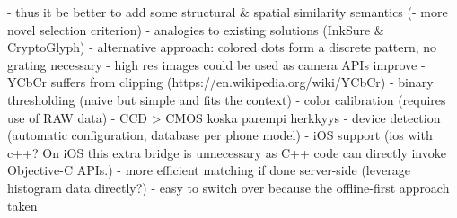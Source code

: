 \documentclass[thesis.tex]{subfiles}
\begin{document}
\begin{comment}
Color calibration

There are mainly two modules responsible for the color-rendering accuracy of a digital camera: the former is the illuminant estimation and correction module, and the latter is the color matrix transformation aimed to adapt the color response of the sensor to a standard color space. These two modules together form what may be called the color correction pipeline.

RGB is a device-dependent color model: different devices detect or reproduce a given RGB value differently, since the color elements (such as phosphors or dyes) and their response to the individual R, G, and B levels vary from manufacturer to manufacturer, or even in the same device over time. Thus an RGB value does not define the same color across devices without some kind of color management.

\url{http://www.cis.rit.edu/~jxj1770/publications/paperEI_Xerox.pdf}

\url{http://www.cs.unc.edu/techreports/04-012.pdf}
\end{comment}

- thus it be better to add some structural \& spatial similarity semantics (- more novel selection criterion) - analogies to existing solutions (InkSure \& CryptoGlyph)
  - alternative approach: colored dots form a discrete pattern, no grating necessary
- high res images could be used as camera APIs improve
- YCbCr suffers from clipping (https://en.wikipedia.org/wiki/YCbCr)
- binary thresholding (naive but simple and fits the context)
- color calibration (requires use of RAW data)
  - CCD > CMOS koska parempi herkkyys
- device detection (automatic configuration, database per phone model)
- iOS support (ios with c++? On iOS this extra bridge is unnecessary as C++ code can directly invoke Objective-C APIs.)
- more efficient matching if done server-side (leverage histogram data directly?)
  - easy to switch over because the offline-first approach taken

\end{document}
